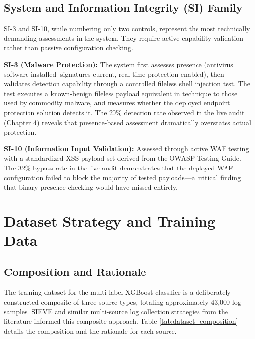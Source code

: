 \documentclass[12pt,oneside]{report}
\begin{document}
\subsection{System and Information Integrity (SI) Family}

SI-3 and SI-10, while numbering only two controls, represent the most technically demanding assessments in the system. They require active capability validation rather than passive configuration checking.

\textbf{SI-3 (Malware Protection):} The system first assesses presence (antivirus software installed, signatures current, real-time protection enabled), then validates detection capability through a controlled fileless shell injection test. The test executes a known-benign fileless payload equivalent in technique to those used by commodity malware, and measures whether the deployed endpoint protection solution detects it. The 20\% detection rate observed in the live audit (Chapter 4) reveals that presence-based assessment dramatically overstates actual protection.

\textbf{SI-10 (Information Input Validation):} Assessed through active WAF testing with a standardized XSS payload set derived from the OWASP Testing Guide. The 32\% bypass rate in the live audit demonstrates that the deployed WAF configuration failed to block the majority of tested payloads—a critical finding that binary presence checking would have missed entirely.

\section{Dataset Strategy and Training Data}

\subsection{Composition and Rationale}

The training dataset for the multi-label XGBoost classifier is a deliberately constructed composite of three source types, totaling approximately 43,000 log samples. SIEVE \cite{sieve_dataset} and similar multi-source log collection strategies from the literature informed this composite approach. Table \ref{tab:dataset_composition} details the composition and the rationale for each source.
\end{document}
